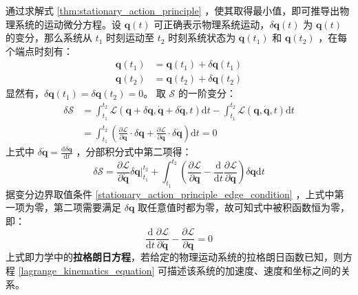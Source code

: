 \documentclass[cn,11pt,chinese,blue,bibstyle=ieeetr]{elegantbook}
\begin{document}
{通过求解式 \ref{thm:stationary_action_principle} ，使其取得最小值，即可推导出物理系统的运动微分方程。设 $\bm{q}(t)$ 可正确表示物理系统运动，$\delta{\bm{q}(t)}$ 为 $\bm{q}(t)$ 的变分，那么系统从 $t_1$ 时刻运动至 $t_2$ 时刻系统状态为 $\bm{q}(t_1)$ 和 $\bm{q}(t_2)$ ，在每个端点时刻有：
	\begin{equation}\label{stationary_action_principle_edge_condition}
	\begin{aligned}
		\bm{q}(t_1) &= \bm{q}(t_1) + \delta{\bm{q}(t_1)} \\
		\bm{q}(t_2) &= \bm{q}(t_2) + \delta{\bm{q}(t_2)}
	\end{aligned}
	\end{equation}
显然有，$\delta{\bm{q}(t_1)} = \delta{\bm{q}(t_2)} = 0$。
取 $\mathcal{S}$ 的一阶变分：
	\begin{equation}
	\begin{aligned}
		\delta{\mathcal{S}} &= \int_{t_1}^{t_2} {\mathcal{L} \left( \bm{q} + \delta{\bm{q}}, \dot{\bm{q}} + \delta{\dot{\bm{q}}}, t \right) {\mathrm{d} t}} - 
		\int_{t_1}^{t_2} {\mathcal{L} \left( \bm{q}, \dot{\bm{q}}, t \right) {\mathrm{d} t}} \\
		&= \int_{t_1}^{t_2} {\left( \frac{\partial \mathcal{L}}{\partial \bm{q}} \cdot \delta{\bm{q}} + 
		\frac{\partial \mathcal{L}}{\partial \dot{\bm{q}}} \cdot \delta{\dot{\bm{q}}} \right) {\mathrm{d} t}} = 0 \nonumber
	\end{aligned}
	\end{equation}
上式中 $\delta{\dot{\bm{q}}} = {\frac{\mathrm{d}  \delta{\bm{q}}}{\mathrm{d}t}}$ ，分部积分式中第二项得：
	\begin{equation}\label{stationary_action_principle_int_by_part}
		\delta{\mathcal{S}} = { \frac{\partial{\mathcal{L}}}{\partial{\dot{\bm{q}}}} \delta{\bm{q}} \Bigg|_{t_1}^{t_2} } + 
		\int_{t_1}^{t_2} {\left( \frac{\partial \mathcal{L}}{\partial \bm{q}} - \frac{\mathrm{d}}{\mathrm{d}t} \frac{\partial \mathcal{L}}{\partial \dot{\bm{q}}} \right) \delta{\bm{q}} \mathrm{d}t}
	\end{equation}
据变分边界取值条件 \ref{stationary_action_principle_edge_condition} ，上式中第一项为零，第二项需要满足 $\delta{\bm{q}}$ 取任意值时都为零，故可知式中被积函数恒为零，即：
	\begin{equation}\label{lagrange_kinematics_equation}
		\frac{\mathrm{d}}{\mathrm{d}t} \frac{\partial \mathcal{L}}{\partial \dot{\bm{q}}} - \frac{\partial \mathcal{L}}{\partial \bm{q}} = 0
	\end{equation}
上式即力学中的\textbf{拉格朗日方程}，若给定的物理运动系统的拉格朗日函数已知，则方程 \ref{lagrange_kinematics_equation} 可描述该系统的加速度、速度和坐标之间的关系。

}
\end{document}
